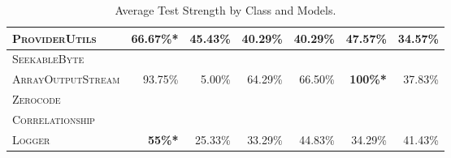 \begin{table}[H]
\begin{tabular}{| l | r | r | r | r | r | r |}
\scriptsize\textsc{ProviderUtils} & \textbf{66.67\%*} & 45.43\% & 40.29\% & 40.29\% & 47.57\% & 34.57\% \\
\hline
\scriptsize\textsc{SeekableByte} &  &  &  &  &  &  \\
\scriptsize\textsc{ArrayOutputStream} & 93.75\% & 5.00\% & 64.29\% & 66.50\% & \textbf{100\%*} & 37.83\% \\
\hline
\scriptsize\textsc{Zerocode} &  &  &  &  &  &  \\
\scriptsize\textsc{Correlationship} &  &  &  &  &  &  \\
\scriptsize\textsc{Logger} & \textbf{55\%*} & 25.33\% & 33.29\% & 44.83\% & 34.29\% & 41.43\% \\
\hline

\end{tabular}
\caption{Average Test Strength by Class and Models.\protect\footnotemark}
\label{tab:test_strength}
\end{table}


